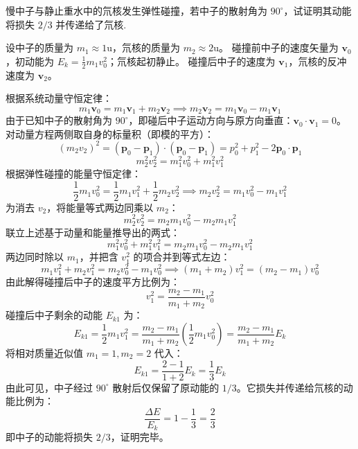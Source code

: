 \begin{exercise}\label{ex:5.8}
慢中子与静止重水中的氘核发生弹性碰撞，若中子的散射角为 $90^\circ$，试证明其动能将损失 $2/3$ 并传递给了氘核.
\end{exercise}
\begin{solution}
设中子的质量为 $m_1 \approx 1\mathrm{u}$，氘核的质量为 $m_2 \approx 2\mathrm{u}$。
碰撞前中子的速度矢量为 $\boldsymbol{v}_0$，初动能为 $E_k = \frac{1}{2}m_1 v_0^2$；氘核起初静止。
碰撞后中子的速度为 $\boldsymbol{v}_1$，氘核的反冲速度为 $\boldsymbol{v}_2$。

根据系统动量守恒定律：
$$ m_1 \boldsymbol{v}_0 = m_1 \boldsymbol{v}_1 + m_2 \boldsymbol{v}_2 \implies m_2 \boldsymbol{v}_2 = m_1 \boldsymbol{v}_0 - m_1 \boldsymbol{v}_1 $$
由于已知中子的散射角为 $90^\circ$，即碰后中子运动方向与原方向垂直：$\boldsymbol{v}_0 \cdot \boldsymbol{v}_1 = 0$。
对动量方程两侧取自身的标量积（即模的平方）：
$$ (m_2 v_2)^2 = (\boldsymbol{p}_0 - \boldsymbol{p}_1) \cdot (\boldsymbol{p}_0 - \boldsymbol{p}_1) = p_0^2 + p_1^2 - 2\boldsymbol{p}_0 \cdot \boldsymbol{p}_1 $$
$$ m_2^2 v_2^2 = m_1^2 v_0^2 + m_1^2 v_1^2 $$
根据弹性碰撞的能量守恒定律：
$$ \frac{1}{2} m_1 v_0^2 = \frac{1}{2} m_1 v_1^2 + \frac{1}{2} m_2 v_2^2 \implies m_2 v_2^2 = m_1 v_0^2 - m_1 v_1^2 $$
为消去 $v_2$，将能量等式两边同乘以 $m_2$：
$$ m_2^2 v_2^2 = m_2 m_1 v_0^2 - m_2 m_1 v_1^2 $$
联立上述基于动量和能量推导出的两式：
$$ m_1^2 v_0^2 + m_1^2 v_1^2 = m_2 m_1 v_0^2 - m_2 m_1 v_1^2 $$
两边同时除以 $m_1$，并把含 $v_1^2$ 的项合并到等式左边：
$$ m_1 v_1^2 + m_2 v_1^2 = m_2 v_0^2 - m_1 v_0^2 \implies (m_1 + m_2) v_1^2 = (m_2 - m_1) v_0^2 $$
由此解得碰撞后中子的速度平方比例为：
$$ v_1^2 = \frac{m_2 - m_1}{m_1 + m_2} v_0^2 $$
碰撞后中子剩余的动能 $E_{k1}$ 为：
$$ E_{k1} = \frac{1}{2} m_1 v_1^2 = \frac{m_2 - m_1}{m_1 + m_2} \left( \frac{1}{2} m_1 v_0^2 \right) = \frac{m_2 - m_1}{m_1 + m_2} E_k $$
将相对质量近似值 $m_1 = 1, m_2 = 2$ 代入：
$$ E_{k1} = \frac{2 - 1}{1 + 2} E_k = \frac{1}{3} E_k $$
由此可见，中子经过 $90^\circ$ 散射后仅保留了原动能的 $1/3$。它损失并传递给氘核的动能比例为：
$$ \frac{\Delta E}{E_k} = 1 - \frac{1}{3} = \frac{2}{3} $$
即中子的动能将损失 $2/3$，证明完毕。
\end{solution}

